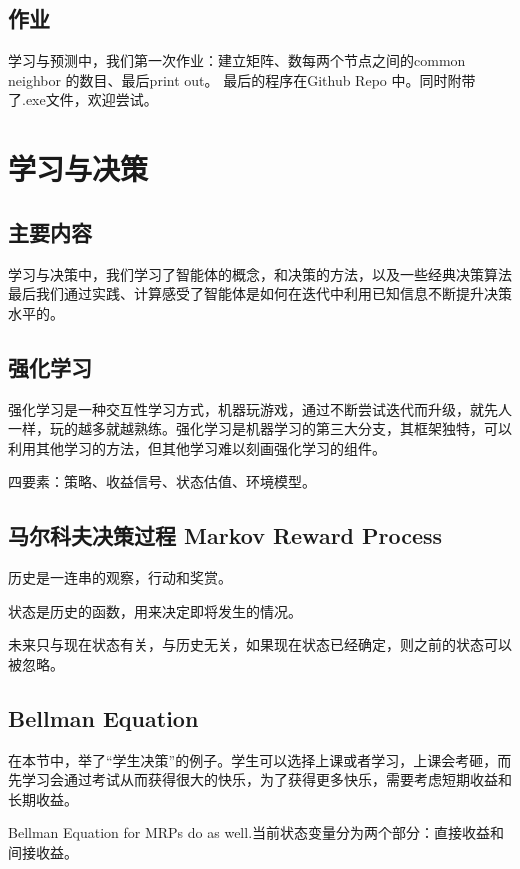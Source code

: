 \documentclass[letterpaper]{article} %
\begin{document}
\subsection{作业}
学习与预测中，我们第一次作业：建立矩阵、数每两个节点之间的common neighbor 的数目、最后print out。
最后的程序在Github Repo 中。同时附带了.exe文件，欢迎尝试。


\section{学习与决策}
\subsection{主要内容}

学习与决策中，我们学习了智能体的概念，和决策的方法，以及一些经典决策算法最后我们通过实践、计算感受了智能体是如何在迭代中利用已知信息不断提升决策水平的。

\subsection{强化学习}

强化学习是一种交互性学习方式，机器玩游戏，通过不断尝试迭代而升级，就先人一样，玩的越多就越熟练。强化学习是机器学习的第三大分支，其框架独特，可以利用其他学习的方法，但其他学习难以刻画强化学习的组件。

四要素：策略、收益信号、状态估值、环境模型。

\subsection{马尔科夫决策过程 Markov Reward Process}

历史是一连串的观察，行动和奖赏。

状态是历史的函数，用来决定即将发生的情况。

未来只与现在状态有关，与历史无关，如果现在状态已经确定，则之前的状态可以被忽略。


\subsection{Bellman Equation}

在本节中，举了“学生决策”的例子。学生可以选择上课或者学习，上课会考砸，而先学习会通过考试从而获得很大的快乐，为了获得更多快乐，需要考虑短期收益和长期收益。

Bellman Equation for MRPs do as well.当前状态变量分为两个部分：直接收益和间接收益。
\end{document}
